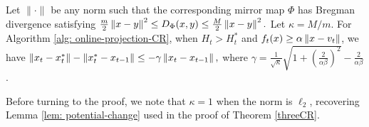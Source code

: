 \begin{lemma} \label{lem: general}
Let $\| \cdot \|$ be any norm such that the corresponding mirror map $\Phi$ has Bregman divergence satisfying $\frac{m}{2}\left\lVert x-y \right\rVert^2 \le D_{\Phi}(x,y) \le \frac{M}{2}\left\lVert x-y \right\rVert^2.$
Let $\kappa = M/m$. For Algorithm \ref{alg: online-projection-CR}, when $H_t > H_t^*$ and $f_t(x) \ge \alpha\left\lVert x - v_t \right\rVert$, we have $ \left\lVert x_t - x_t^* \right\rVert - \left\lVert x_t^* - x_{t-1}  \right\rVert \le -\gamma \left\lVert x_t - x_{t-1} \right\rVert,$	where $\gamma = \frac{1}{\sqrt{\kappa}}\sqrt{1 + \left( \frac{2}{\alpha\beta}\right)^2} - \frac{2}{\alpha\beta}$.
\end{lemma}

\noindent Before turning to the proof, we note that $\kappa = 1$ when the norm is $\ell_2$, recovering Lemma \ref{lem: potential-change} used in the proof of Theorem \ref{threeCR}. 

